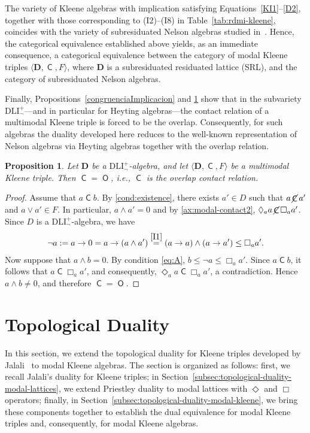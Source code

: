 \documentclass[10pt,a4paper]{amsart}
\newtheorem{proposition}[theorem]{Proposition}
\DeclareMathOperator{\con}{\mathsf{C}}
\DeclareMathOperator{\notcon}{\cancel{ \con}}
\DeclareMathOperator{\Overl}{\mathsf{O}}
\newcommand{\D}{\mathbf{D}}
\begin{document}
The variety of Kleene algebras with implication satisfying Equations~\eqref{KI1}--\eqref{D2}, together with those corresponding to (I2)--(I8) in Table~\ref{tab:rdmi-kleene}, coincides with the variety of subresiduated Nelson algebras studied in~\cite{noemi2025}. Hence, the categorical equivalence established above yields, as an immediate consequence, a categorical equivalence between the category of modal Kleene triples $\langle\D,\con,F\rangle$, where $\D$ is a subresiduated residuated lattice (SRL), and the category of subresiduated Nelson algebras.

Finally, Propositions~\ref{congruenciaImplicacion} and \ref{prop:DLIneg-forces-overlap} show that in the subvariety $\mathrm{DLI}_{\neg}^+$—and in particular for Heyting algebras—the contact relation of a multimodal Kleene triple is forced to be the overlap. Consequently, for such algebras the duality developed here reduces to the well-known representation of Nelson algebras via Heyting algebras together with the overlap relation. 

\begin{proposition}
\label{prop:DLIneg-forces-overlap}
Let $\D$ be a $\mathrm{DLI}_{\neg}^+$-algebra, and let $\langle\D,\con,F\rangle$ be a multimodal Kleene triple. Then $\con =\Overl$, i.e., $\con$ is the overlap contact relation.
\end{proposition}
\begin{proof}
Assume that $a\con b$. By \eqref{cond:existence}, there exists $a' \in D$ such that
$a\notcon a'$ and $a \vee a' \in F$. In particular, $a \wedge a' = 0$ and by \eqref{ax:modal-contact2}, $\Diamond_a a \notcon \Box_a a'$. Since $D$ is a $\mathrm{DLI}_{\neg}^+$-algebra, we have
\begin{align*}
    \neg a := a \to 0 = a \to (a \wedge a') \overset{\eqref{I1}}{=} (a \to a) \wedge (a \to a') \leq \Box_a a'.
\end{align*}
Now suppose that $a \wedge b = 0$. By condition \eqref{eq:A}, $b \leq \neg a \leq \Box_a a'$. Since $a\con b$, it follows that $a\con \Box_a a'$, and consequently, $\Diamond_a a \con \Box_a a'$, a contradiction. Hence $a\wedge b\neq 0$, and therefore $\con = \Overl$.
\end{proof}

\section{Topological Duality}
\label{sec:topological-duality}

In this section, we extend the topological duality for Kleene triples developed by Jalali~\cite{jalali} to modal Kleene algebras. The section is organized as follows: first, we recall Jalali's duality for Kleene triples; in Section~\ref{subsec:topological-duality-modal-lattices}, we extend Priestley duality to modal lattices with $\Diamond$ and $\Box$ operators; finally, in Section~\ref{subsec:topological-duality-modal-kleene}, we bring these components together to establish the dual equivalence for modal Kleene triples and, consequently, for modal Kleene algebras.
\end{document}
